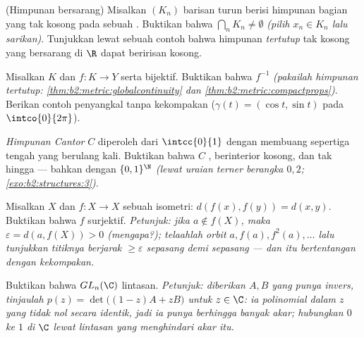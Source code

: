 \begin{exercise}[$\star\star$]\label{exo:b2:metric:6}
(Himpunan  bersarang) Misalkan $(K_n)$ barisan turun berisi
himpunan bagian  yang tak kosong pada sebuah .
Buktikan bahwa $\bigcap_n K_n \neq \emptyset$ \emph{(pilih $x_n \in K_n$
lalu sarikan)}. Tunjukkan lewat sebuah contoh bahwa himpunan
\emph{tertutup} tak kosong yang bersarang di $\R$ dapat beririsan kosong.
\end{exercise}

\begin{exercise}[$\star\star$]\label{exo:b2:metric:7}
Misalkan $K$  dan $f \colon K \to Y$  serta bijektif.
Buktikan bahwa $f^{-1}$  \emph{(pakailah himpunan tertutup:
\cref{thm:b2:metric:globalcontinuity} dan
\cref{thm:b2:metric:compactprops})}. Berikan contoh penyangkal tanpa
kekompakan ($\gamma(t) = (\cos t, \sin t)$ pada
$\intco{0}{2\pi}$).
\end{exercise}

\begin{exercise}[$\star\star$]\label{exo:b2:metric:8}
\emph{Himpunan Cantor} $C$ diperoleh dari $\intcc{0}{1}$ dengan
membuang sepertiga tengah yang  berulang kali. Buktikan bahwa $C$
, berinterior kosong, dan tak hingga --- bahkan  dengan
$\{0,1\}^{\N}$ \emph{(lewat uraian terner berangka $0,2$;
\cref{exo:b2:structures:3})}.
\end{exercise}

\begin{exercise}[$\star\star\star$]\label{exo:b2:metric:9}
Misalkan $X$  \emph{} dan $f \colon X \to X$ sebuah
isometri: $d(f(x), f(y)) = d(x, y)$. Buktikan bahwa $f$ surjektif.
\emph{Petunjuk: jika $a \notin f(X)$, maka $\varepsilon = d(a, f(X)) > 0$
(mengapa?); telaahlah orbit $a, f(a), f^2(a), \dots$ lalu tunjukkan
titiknya berjarak $\geq \varepsilon$ sepasang demi sepasang --- dan itu
bertentangan dengan kekompakan.}
\end{exercise}

\begin{exercise}[$\star\star\star$]\label{exo:b2:metric:10}
Buktikan bahwa $GL_n(\C)$  lintasan. \emph{Petunjuk: diberikan
$A, B$ yang punya invers, tinjaulah $p(z) = \det\bigl((1 - z)A + zB\bigr)$
untuk $z \in \C$: ia polinomial dalam $z$ yang tidak nol secara identik,
jadi ia punya berhingga banyak akar; hubungkan $0$ ke $1$ di $\C$ lewat
lintasan yang menghindari akar itu.}
\end{exercise}

